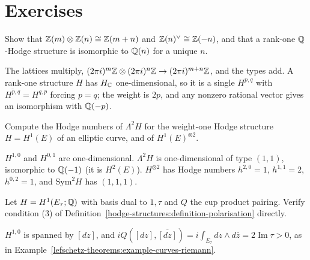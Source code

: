 \section{Exercises}\label{hodge-structures:section-exercises}

\begin{exercise}\label{hodge-structures:exercise-tate-tensor}
Show that $\mathbb{Z}(m) \otimes \mathbb{Z}(n) \cong \mathbb{Z}(m + n)$ and $\mathbb{Z}(n)^\vee \cong \mathbb{Z}(-n)$, and that a rank-one $\mathbb{Q}$-Hodge structure is isomorphic to $\mathbb{Q}(n)$ for a unique $n$.
\end{exercise}

\begin{solution}
The lattices multiply, $(2\pi i)^m\mathbb{Z} \otimes (2\pi i)^n\mathbb{Z} \to (2\pi i)^{m+n}\mathbb{Z}$, and the types add. A rank-one structure $H$ has $H_{\mathbb{C}}$ one-dimensional, so it is a single $H^{p,q}$ with
$\overline{H^{p,q}} = H^{q,p}$ forcing $p = q$; the weight is $2p$, and any nonzero rational vector gives an isomorphism with $\mathbb{Q}(-p)$.
\end{solution}

\begin{exercise}\label{hodge-structures:exercise-hodge-numbers-tensor}
Compute the Hodge numbers of $\Lambda^2H$ for the weight-one Hodge structure $H = H^1(E)$ of an elliptic curve, and of $H^1(E)^{\otimes 2}$.
\end{exercise}

\begin{solution}
$H^{1,0}$ and $H^{0,1}$ are one-dimensional. $\Lambda^2H$ is one-dimensional of type $(1,1)$, isomorphic to $\mathbb{Q}(-1)$ (it is $H^2(E)$). $H^{\otimes 2}$ has Hodge numbers
$h^{2,0} = 1$, $h^{1,1} = 2$, $h^{0,2} = 1$, and $\mathrm{Sym}^2H$ has $(1, 1, 1)$.
\end{solution}

\begin{exercise}\label{hodge-structures:exercise-polarisation-elliptic}
Let $H = H^1(E_\tau; \mathbb{Q})$ with basis dual to $1, \tau$ and $Q$ the cup product pairing. Verify condition (3) of Definition~\ref{hodge-structures:definition-polarisation} directly.
\end{exercise}

\begin{solution}
$H^{1,0}$ is spanned by $[dz]$, and $iQ([dz], \overline{[dz]}) = i\int_{E_\tau}dz \wedge d\bar z = 2\operatorname{Im}\tau > 0$, as in Example~\ref{lefschetz-theorems:example-curves-riemann}.
\end{solution}
